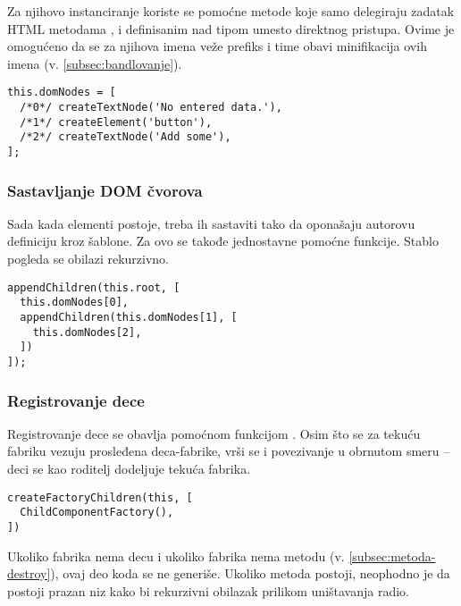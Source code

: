 Za njihovo instanciranje koriste se pomoćne metode koje samo delegiraju zadatak HTML metodama ,  i  definisanim nad tipom  umesto direktnog pristupa.
Ovime je omogućeno da se za njihova imena veže prefiks  i time obavi minifikacija ovih imena (v. \cref{subsec:bandlovanje}).

\begin{lstlisting}
this.domNodes = [
  /*0*/ createTextNode('No entered data.'),
  /*1*/ createElement('button'),
  /*2*/ createTextNode('Add some'),
];
\end{lstlisting}

\subsubsection{Sastavljanje DOM čvorova}
\label{subsubsec:init-part-5}

Sada kada elementi postoje, treba ih sastaviti tako da oponašaju autorovu definiciju kroz šablone.
Za ovo se takođe jednostavne pomoćne funkcije.
Stablo pogleda se obilazi rekurzivno.

\begin{lstlisting}
appendChildren(this.root, [
  this.domNodes[0],
  appendChildren(this.domNodes[1], [
    this.domNodes[2],
  ])
]);
\end{lstlisting}

\subsubsection{Registrovanje dece}
\label{subsubsec:registrovanje-dece}
\label{subsubsec:init-part-6}

Registrovanje dece se obavlja pomoćnom funkcijom .
Osim što se za tekuću fabriku vezuju prosleđena deca-fabrike, vrši se i povezivanje u obrnutom smeru -- deci se kao roditelj dodeljuje tekuća fabrika.

\begin{lstlisting}
createFactoryChildren(this, [
  ChildComponentFactory(),
])
\end{lstlisting}

Ukoliko fabrika nema decu i ukoliko fabrika nema  metodu (v. \cref{subsec:metoda-destroy}), ovaj deo koda se ne generiše.
Ukoliko metoda  postoji, neophodno je da postoji prazan niz  kako bi rekurzivni obilazak prilikom uništavanja radio.

